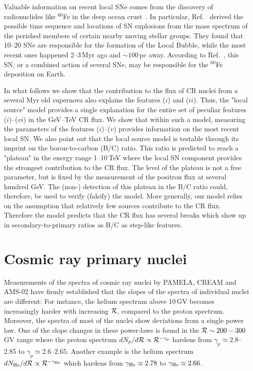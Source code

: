 \documentclass[prd,aps,twocolumn]{revtex4}
\def\R{{\cal R}}
\begin{document}
Valuable information on recent local SNe comes from the discovery of 
radionuclides like $^{60}$Fe in the deep ocean crust~\cite{fe60}. In particular,
 Ref.~\cite{Sc17} derived the possible time sequence and locations of SN
explosions from the mass spectrum of the perished members of certain nearby 
moving stellar groups. They found that 10--20 SNe are 
responsible for the formation of the Local Bubble, while the most recent 
ones happened 2--3\,Myr ago and $\sim 100$\,pc away. According to 
Ref.~\cite{Sc17}, this SN, or a combined action of several SNe,  
may be responsible for the $^{60}$Fe deposition on Earth.

In what follows we show that the contribution to the flux of CR nuclei 
from a several Myr old supernova also explains the features ($i$) and ($ii$). 
Thus, the "local source" model provides a single explanation for the entire 
set of peculiar features ($i$)--($vi$) in the GeV--TeV CR flux. We show that 
within such a model, measuring the parameters of the features ($i$)--($v$) 
provides information on the most recent local SN. 
We also point out that the local source model is testable through its 
imprint on the boron-to-carbon (B/C) ratio. This ratio is predicted to reach a 
"plateau" in the energy range 1--10\,TeV where the local SN
component provides the strongest contribution to the CR flux.  
The level of the plateau is not a free parameter, but is fixed by 
the measurement of the positron flux at several hundred GeV. 
The (non-) detection of this plateau in the B/C ratio could, therefore, be 
used to verify (falsify) the model.  
More generally, our model relies on the assumption that relatively few sources
contribute to the CR flux. Therefore the model predicts that the CR flux
has several breaks which show up in secondary-to-primary ratios as B/C
as step-like features.




\section{Cosmic ray primary nuclei}

Measurements of the spectra of cosmic ray nuclei by PAMELA, CREAM and AMS-02 
have firmly established that the slopes of the spectra of individual nuclei 
are different: For instance, the helium spectrum above 10\,GV becomes 
increasingly harder with increasing $\R$,  compared to the proton spectrum. 
Moreover, the spectra of most of the nuclei show deviations from a single 
power law. One of the slope changes in these power-laws  is found in the 
$\R\sim 200-300$\,GV range where the proton spectrum 
$dN_p/d\R\propto \R^{-\gamma_p}$ hardens from $\gamma_p\simeq 2.8$--2.85 to 
$\gamma_p\simeq 2.6$--2.65. Another example is the helium spectrum  
$dN_{\rm He}/d\R\propto \R^{-\gamma_{\rm He}}$ which hardens from 
$\gamma_{\rm He}\simeq 2.78$ to $\gamma_{\rm He}\simeq 2.66$.
\end{document}
